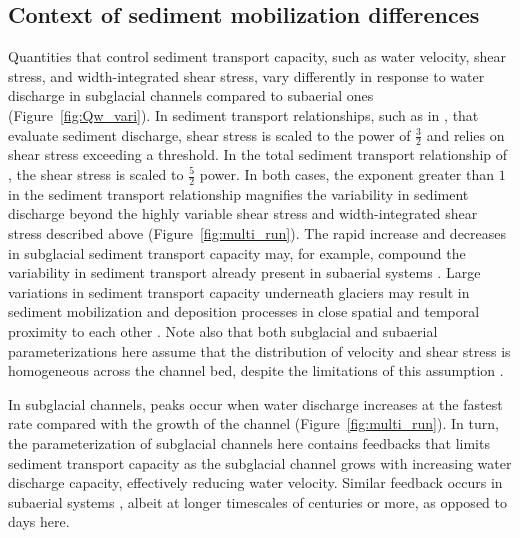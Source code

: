 \documentclass[11pt]{article}
\begin{document}
\subsection{Context of sediment mobilization differences}
Quantities that control sediment transport capacity, such as water velocity, shear stress, and width-integrated shear stress, vary differently in response to water discharge in subglacial channels compared to subaerial ones (Figure~\ref{fig:Qw_vari}).
In sediment transport relationships, such as in \citet{meyer1948}, that evaluate sediment discharge, shear stress is scaled to the power of $\frac{3}{2}$ and relies on shear stress exceeding a threshold.
In the total sediment transport relationship of \citet{engelund1967}, the shear stress is scaled to $\frac{5}{2}$ power.
In both cases, the exponent greater than $1$ in the sediment transport relationship magnifies the variability in sediment discharge beyond the highly variable shear stress and width-integrated shear stress described above (Figure~\ref{fig:multi_run}).
The rapid increase and decreases in subglacial sediment transport capacity may, for example, compound the variability in sediment transport already present in subaerial systems \citep[Figure~\ref{fig:Qw_vari}; ][]{williams1989,jerolmack2010}.
Large variations in sediment transport capacity underneath glaciers may result in sediment mobilization and deposition processes in close spatial and temporal proximity to each other \citep{gimbert2016,perolo2018}.
Note also that both subglacial and subaerial parameterizations here assume that the distribution of velocity and shear stress is homogeneous across the channel bed, despite the limitations of this assumption \citep[e.g.][]{yager2018}.


In subglacial channels, peaks occur when water discharge increases at the fastest rate compared with the growth of the channel (Figure~\ref{fig:multi_run}).
In turn, the parameterization of subglacial channels here contains feedbacks that limits sediment transport capacity as the subglacial channel grows with increasing water discharge capacity, effectively reducing water velocity.
Similar feedback occurs in subaerial systems \citep{phillips2016}, albeit at longer timescales of centuries or more, as opposed to days here.
\end{document}
